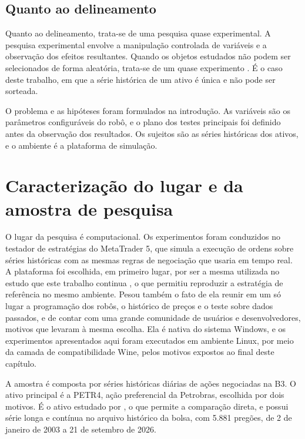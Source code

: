 \subsection{Quanto ao delineamento}

Quanto ao delineamento, trata-se de uma pesquisa quase experimental. A pesquisa
experimental envolve a manipulação controlada de variáveis e a observação dos
efeitos resultantes. Quando os objetos estudados não podem ser selecionados de
forma aleatória, trata-se de um quase experimento \cite{wazlawick2021}. É o caso
deste trabalho, em que a série histórica de um ativo é única e não pode ser
sorteada.

O problema e as hipóteses foram formulados na introdução. As variáveis são os parâmetros
configuráveis do robô, e o plano dos testes principais foi definido antes da
observação dos resultados. Os sujeitos são as séries históricas dos ativos, e o ambiente é a
plataforma de simulação.

\section{Caracterização do lugar e da amostra de pesquisa}

O lugar da pesquisa é computacional. Os experimentos foram conduzidos no testador
de estratégias do MetaTrader 5, que simula a execução de ordens sobre séries
históricas com as mesmas regras de negociação que usaria em tempo real. A
plataforma foi escolhida, em primeiro lugar, por ser a mesma utilizada no estudo
que este trabalho continua \cite{almeida2016}, o que permitiu reproduzir a
estratégia de referência no mesmo ambiente. Pesou também o fato de ela reunir em
um só lugar a programação dos robôs, o histórico de preços e o teste sobre dados
passados, e de contar com uma grande comunidade de usuários e desenvolvedores,
motivos que levaram  à mesma escolha. Ela é nativa do sistema Windows, e os experimentos
apresentados aqui foram executados em ambiente Linux, por meio da camada de
compatibilidade Wine, pelos motivos expostos ao final deste capítulo.

A amostra é composta por séries históricas diárias de ações negociadas na B3. O
ativo principal é a PETR4, ação preferencial da Petrobras, escolhida por dois
motivos. É o ativo estudado por , o que permite a
comparação direta, e possui série longa e contínua no arquivo histórico da bolsa, com 5.881 pregões, de 2 de janeiro de 2003 a 21 de
setembro de 2026.

